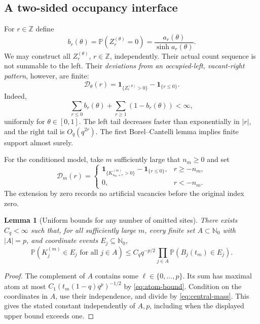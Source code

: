\documentclass[11pt,a4paper]{article}
\numberwithin{equation}{section}
\newtheorem{lemma}[theorem]{Lemma}
\theoremstyle{definition}
\theoremstyle{remark}
\newcommand{\PP}{\mathbb P}
\newcommand{\N}{\mathbb N}
\newcommand{\Z}{\mathbb Z}
\newcommand{\ind}{\mathbf 1}
\begin{document}
\subsection{A two-sided occupancy interface}
For $r\in\Z$ define
\begin{equation}
b_r(\theta)=\PP(Z_r^{(\theta)}=0)
=\frac{a_r(\theta)}{\sinh a_r(\theta)}.
\label{eq:vacancy}
\end{equation}
We may construct all $Z_r^{(\theta)}$, $r\in\Z$, independently.
Their actual count sequence is not summable to the left. Their
\emph{deviations from an occupied-left, vacant-right pattern}, however,
are finite:
\begin{equation}
\mathcal D_\theta(r)
=\ind_{\{Z_r^{(\theta)}>0\}}-\ind_{\{r\le0\}}.
\label{eq:limit-defect}
\end{equation}
Indeed,
\begin{equation}
\sum_{r\le0}b_r(\theta)+\sum_{r\ge1}(1-b_r(\theta))<\infty,
\label{eq:defect-sum}
\end{equation}
uniformly for $\theta\in[0,1]$. The left tail decreases faster than
exponentially in $|r|$, and the right tail is $O_q(q^{2r})$.
The first Borel--Cantelli lemma implies finite support almost surely.

For the conditioned model, take $m$ sufficiently large that $n_m\ge0$ and set
\begin{equation}
\mathcal D_m(r)=
\begin{cases}
\ind_{\{K_{n_m+r}^{(m)}>0\}}-\ind_{\{r\le0\}},&r\ge-n_m,\\
0,&r<-n_m.
\end{cases}
\label{eq:finite-defect}
\end{equation}
The extension by zero records no artificial vacancies before the original
index zero.

\begin{lemma}[Uniform bounds for any number of omitted sites]
\label{lem:multi-domination}
There exists $C_q<\infty$ such that, for all sufficiently large $m$,
every finite set $A\subset\N_0$ with $|A|=p$, and coordinate events
$E_j\subseteq\N_0$,
\begin{equation}
\PP(K_j^{(m)}\in E_j\text{ for all }j\in A)
\le C_q q^{-p/2}\prod_{j\in A}\PP(B_j(t_m)\in E_j).
\label{eq:multi-domination}
\end{equation}
\end{lemma}
\begin{proof}
The complement of $A$ contains some $\ell\in\{0,\ldots,p\}$.
Its sum has maximal atom at most
$C_1(t_m(1-q)q^p)^{-1/2}$ by \cref{eq:atom-bound}.
Condition on the coordinates in $A$, use their independence, and divide
by \cref{eq:central-mass}. This gives the stated constant independently
of $A,p$, including when the displayed upper bound exceeds one.
\end{proof}
\end{document}
